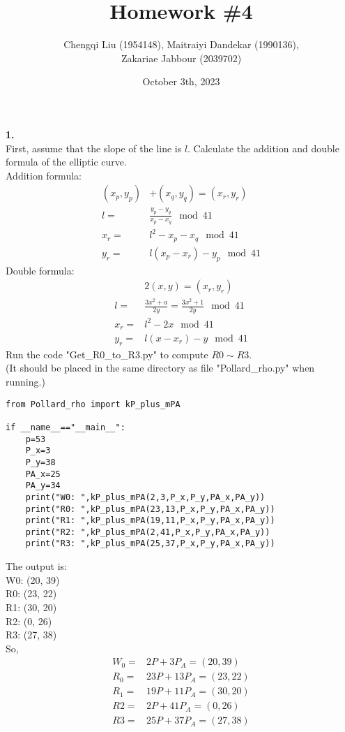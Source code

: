 \documentclass[
12pt, %
]{fphw}
\title{Homework \#4} %
\author{Chengqi Liu (1954148), Maitraiyi Dandekar (1990136),\\ Zakariae Jabbour (2039702)} %
\date{October 3th, 2023} %
\institute{Eindhoven University of Technology} %
\begin{document}
\maketitle %

\textbf{1.\\}
First, assume that the slope of the line is $l$. Calculate the addition and double formula of the elliptic curve.\\
Addition formula:
\begin{align*}
	(x_p,y_p)&+(x_q,y_q)=(x_r,y_r)\\
	l=&\frac{y_p-y_q}{x_p-x_q} \mod 41\\
	x_r=&l^2-x_p-x_q \mod 41\\
	y_r=&l(x_p-x_r)-y_p \mod 41
\end{align*}
Double formula:
\begin{align*}
	&2(x,y)=(x_r,y_r)\\
	l=&\frac{3x^2+a}{2y}=\frac{3x^2+1}{2y}\mod 41\\
	x_r=&l^2-2x \mod 41\\
	y_r=&l(x-x_r)-y \mod 41
\end{align*}
Run the code "Get\_R0\_to\_R3.py" to compute $R0\sim R3$.\\
(It should be placed in the same directory as file "Pollard\_rho.py" when running.)
\begin{lstlisting}
from Pollard_rho import kP_plus_mPA

if __name__=="__main__":
	p=53
	P_x=3
	P_y=38
	PA_x=25 
	PA_y=34
	print("W0: ",kP_plus_mPA(2,3,P_x,P_y,PA_x,PA_y))
	print("R0: ",kP_plus_mPA(23,13,P_x,P_y,PA_x,PA_y))
	print("R1: ",kP_plus_mPA(19,11,P_x,P_y,PA_x,PA_y))
	print("R2: ",kP_plus_mPA(2,41,P_x,P_y,PA_x,PA_y))
	print("R3: ",kP_plus_mPA(25,37,P_x,P_y,PA_x,PA_y))
\end{lstlisting}
The output is:\\
W0:  (20, 39)\\
R0:  (23, 22)\\
R1:  (30, 20)\\
R2:  (0, 26)\\
R3:  (27, 38)\\
So,
\begin{align*}
	W_0=&2P+3P_A=(20, 39)\\
	R_0=&23P+13P_A=(23, 22)\\
	R_1=&19P+11P_A=(30, 20)\\
	R2=&2P+41P_A=(0, 26)\\
	R3=&25P+37P_A=(27, 38)
\end{align*}
\end{document}
